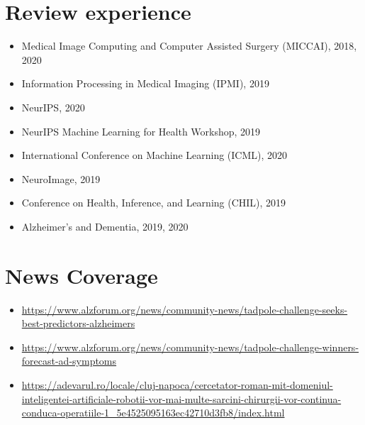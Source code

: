 \documentclass[a4paper,10pt]{article} %
\begin{document}
\section*{Review experience}
\begin{itemize}
 \item Medical Image Computing and Computer Assisted Surgery (MICCAI), 2018, 2020
 \item Information Processing in Medical Imaging (IPMI), 2019
 \item NeurIPS, 2020
 \item NeurIPS Machine Learning for Health Workshop, 2019
 \item International Conference on Machine Learning (ICML), 2020
  \item NeuroImage, 2019
  \item Conference on Health, Inference, and Learning (CHIL), 2019
 \item Alzheimer's and Dementia, 2019, 2020

\end{itemize}


\section*{News Coverage}
\begin{itemize}
 \item \url{https://www.alzforum.org/news/community-news/tadpole-challenge-seeks-best-predictors-alzheimers}
 \item \url{https://www.alzforum.org/news/community-news/tadpole-challenge-winners-forecast-ad-symptoms}
 \item \url{https://adevarul.ro/locale/cluj-napoca/cercetator-roman-mit-domeniul-inteligentei-artificiale-robotii-vor-mai-multe-sarcini-chirurgii-vor-continua-conduca-operatiile-1_5e4525095163ec42710d3fb8/index.html}
\end{itemize}
\end{document}
